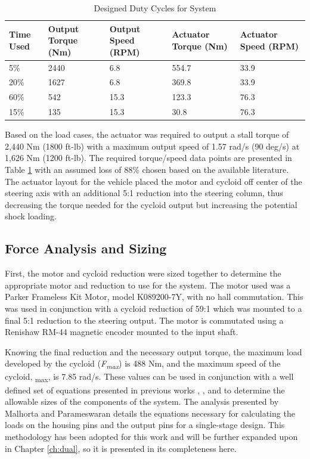 \begin{table}[t]
  \vskip0.2cm
  \caption{Designed Duty Cycles for System}
  \label{table:duty_cycle}
  \begin{center}
    \vskip-0.2cm
    \begin{tabular}{|p{}||p{}||p{}| |p{}| |p{}|}
    \hline
    Time Used & Output Torque (Nm) & Output Speed (RPM) & Actuator Torque (Nm) & Actuator Speed (RPM)\\
    \hline
    5\% & 2440 & 6.8 & 554.7 & 33.9\\
    \hline
    20\% & 1627 & 6.8 & 369.8 & 33.9\\
    \hline
    60\% & 542 & 15.3 & 123.3 & 76.3\\
    \hline
    15\% & 135 & 15.3 & 30.8 & 76.3\\
    \hline
    \end{tabular}
  \end{center}
\end{table}

Based on the load cases, the actuator was required to output a stall torque of 2,440 Nm (1800 ft-lb) with a maximum output speed of 1.57 rad/s (90 deg/s) at 1,626 Nm (1200 ft-lb).
The required torque/speed data points are presented in Table \ref{table:duty_cycle} with an assumed loss of 88\% chosen based on the available literature.
The actuator layout for the vehicle placed the motor and cycloid off center of the steering axis with an additional 5:1 reduction into the steering column, thus decreasing the torque needed for the cycloid output but increasing the potential shock loading.

\subsection{Force Analysis and Sizing} \label{ch:design:single:force_analysis}

First, the motor and cycloid reduction were sized together to determine the appropriate motor and reduction to use for the system. The motor used was a Parker Frameless Kit Motor, model K089200-7Y, with no hall commutation. This was used in conjunction with a cycloid reduction of 59:1 which was mounted to a final 5:1 reduction to the steering output. The motor is commutated using a Renishaw RM-44 magnetic encoder mounted to the input shaft. 

Knowing the final reduction and the necessary output torque, the maximum load developed by the cycloid (\textit{F\textsubscript{max}}) is 488 Nm, and the maximum speed of the cycloid, \textomega\textsubscript{max}, is 7.85 rad/s. These values can be used in conjunction with a well defined set of equations presented in previous works \cite{ref:malhorta_2}, \cite{ref:li}, and \cite{ref:unified_approach} to determine the allowable sizes of the components of the system. The analysis presented by Malhorta and Parameswaran details the equations necessary for calculating the loads on the housing pins and the output pins for a single-stage design. This methodology has been adopted for this work and will be further expanded upon in Chapter \ref{ch:dual}, so it is presented in its completeness here. 

